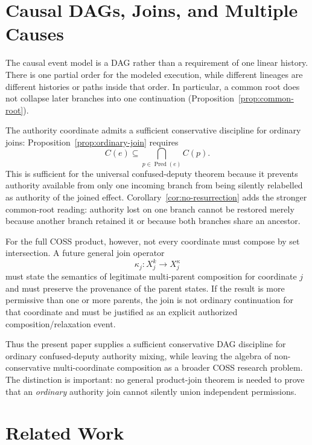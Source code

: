 \documentclass[10pt,twocolumn]{article}
\newcommand{\Pred}{\operatorname{Pred}}
\begin{document}
\section{Causal DAGs, Joins, and Multiple Causes}
\label{sec:dag}

The causal event model is a DAG rather than a requirement of one linear
history.  There is one partial order for the modeled execution, while different
lineages are different histories or paths inside that order.  In particular,
a common root does not collapse later branches into one continuation
(Proposition~\ref{prop:common-root}).

The authority coordinate admits a sufficient conservative discipline for ordinary
joins: Proposition~\ref{prop:ordinary-join} requires
\begin{equation}
  C(e)\subseteq\bigcap_{p\in\Pred(e)}C(p).
\end{equation}
This is sufficient for the universal confused-deputy theorem because it
prevents authority available from only one incoming branch from being silently
relabelled as authority of the joined effect.  Corollary~\ref{cor:no-resurrection}
adds the stronger common-root reading: authority lost on one branch cannot be
restored merely because another branch retained it or because both branches
share an ancestor.

For the full COSS product, however, not every coordinate must compose by set
intersection.  A future general join operator
\begin{equation}
  \kappa_j:X_j^{k}\to X_j^{\kappa}
\end{equation}
must state the semantics of legitimate multi-parent composition for coordinate
$j$ and must preserve the provenance of the parent states.  If the result is
more permissive than one or more parents, the join is not ordinary continuation
for that coordinate and must be justified as an explicit authorized
composition/relaxation event.

Thus the present paper supplies a sufficient conservative DAG discipline for
ordinary confused-deputy authority mixing, while leaving the algebra of non-conservative multi-coordinate
composition as a broader COSS research problem.  The distinction is important:
no general product-join theorem is needed to prove that an \emph{ordinary}
authority join cannot silently union independent permissions.


\section{Related Work}
\end{document}
